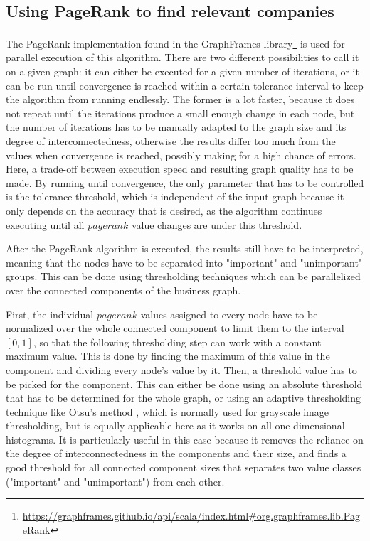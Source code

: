 \documentclass[
  a4paper,     %
  titlepage,   %
  oneside,     %
  parskip      %
]{scrartcl}          %
\begin{document}
  \subsection{Using PageRank to find relevant companies}
  The PageRank implementation found in the GraphFrames
  library\footnote{\url{https://graphframes.github.io/api/scala/index.html\#org.graphframes.lib.PageRank}}
  is used for parallel execution of this algorithm.
  There are two different possibilities to call it on a given graph: it can either
  be executed for a given number of iterations, or it can be run until convergence
  is reached within a certain tolerance interval to keep the algorithm from running endlessly.
  The former is a lot faster, because it does not repeat until the iterations produce
  a small enough change in each node, but the number of iterations
  has to be manually adapted to the graph size and its degree of interconnectedness,
  otherwise the results differ too much from the values when convergence is reached,
  possibly making for a high chance of errors. Here, a trade-off between execution
  speed and resulting graph quality has to be made.
  By running until convergence, the only parameter that has to be controlled is the tolerance threshold,
  which is independent of the input graph because it only depends on the accuracy that is desired,
  as the algorithm continues executing until all $pagerank$ value changes
  are under this threshold.

  After the PageRank algorithm is executed, the results still have to be interpreted,
  meaning that the nodes have to be separated into "important" and "unimportant" groups.
  This can be done using thresholding techniques which can be parallelized
  over the connected components of the business graph.

  First, the individual $pagerank$ values assigned to every node have to be normalized
  over the whole connected component to limit them to the interval $[0, 1]$,
  so that the following thresholding step can work with a constant maximum value.
  This is done by finding the maximum of this
  value in the component and dividing every node's value by it.
  Then, a threshold value has to be picked for the component. This can either be done
  using an absolute threshold that has to be determined for the whole graph, or
  using an adaptive thresholding technique like Otsu's method \cite{otsu1979threshold},
  which is normally used for grayscale image thresholding, but is equally applicable
  here as it works on all one-dimensional histograms.
  It is particularly useful in this case because it removes the reliance
  on the degree of interconnectedness in the components and their size,
  and finds a good threshold for all connected component sizes that separates
  two value classes ("important" and "unimportant") from each other.
\end{document}

